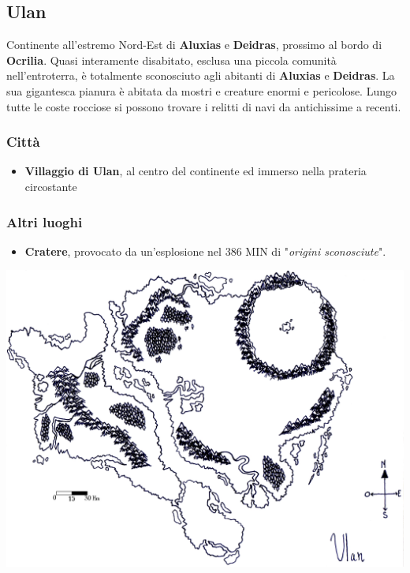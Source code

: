 \documentclass[10pt,twoside,onecolumn,openany]{book}
\begin{document}
\subsection{Ulan}
Continente all'estremo Nord-Est di \textbf{Aluxias} e \textbf{Deidras}, prossimo al bordo di \textbf{Ocrilia}. Quasi interamente disabitato, esclusa una piccola comunità nell'entroterra, è totalmente sconosciuto agli abitanti di \textbf{Aluxias} e \textbf{Deidras}. La sua gigantesca pianura è abitata da mostri e creature enormi e pericolose. Lungo tutte le coste rocciose si possono trovare i relitti di navi da antichissime a recenti.\\
\begin{multicols}{2}
\subsubsection{Città}
\begin{itemize}
\item \textbf{Villaggio di Ulan}, al centro del continente ed immerso nella prateria circostante
\end{itemize}
\columnbreak
\subsubsection{Altri luoghi}
\begin{itemize}
\item \textbf{Cratere}, provocato da un'esplosione nel 386 MIN di "\textit{origini sconosciute}".
\end{itemize}
\end{multicols}
\begin{center}
\includegraphics[scale=0.75]{Ulan}
\end{center}
\newpage
\end{document}
